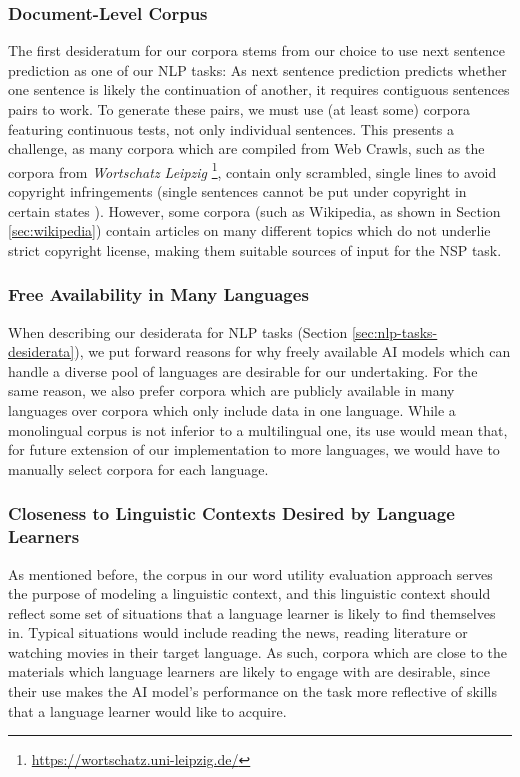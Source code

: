 \subsubsection{Document-Level Corpus} \label{sec:document-level-corpus}
The first desideratum for our corpora stems from our choice to use next sentence prediction as one of our NLP tasks:
As next sentence prediction predicts whether one sentence is likely the continuation of another, it requires contiguous sentences pairs to work.
To generate these pairs, we must use (at least some) corpora featuring continuous tests, not only individual sentences.
This presents a challenge, as many corpora which are compiled from Web Crawls, such as the corpora from \textit{Wortschatz Leipzig} \footnote{\url{https://wortschatz.uni-leipzig.de/}}, contain only scrambled, single lines to avoid copyright infringements (single sentences cannot be put under copyright in certain states \cite{goldhahnBuildingLargeMonolingual2012}).
However, some corpora (such as Wikipedia, as shown in Section \ref{sec:wikipedia}) contain articles on many different topics which do not underlie strict copyright license, making them suitable sources of input for the NSP task.

\subsubsection{Free Availability in Many Languages}
When describing our desiderata for NLP tasks (Section \ref{sec:nlp-tasks-desiderata}), we put forward reasons for why freely available AI models which can handle a diverse pool of languages are desirable for our undertaking.
For the same reason, we also prefer corpora which are publicly available in many languages over corpora which only include data in one language.
While a monolingual corpus is not inferior to a multilingual one, its use would mean that, for future extension of our implementation to more languages, we would have to manually select corpora for each language.

\subsubsection{Closeness to Linguistic Contexts Desired by Language Learners}
As mentioned before, the corpus in our word utility evaluation approach serves the purpose of modeling a linguistic context, and this linguistic context should reflect some set of situations that a language learner is likely to find themselves in.
Typical situations would include reading the news, reading literature or watching movies in their target language.
As such, corpora which are close to the materials which language learners are likely to engage with are desirable, since their use makes the AI model's performance on the task more reflective of skills that a language learner would like to acquire.

